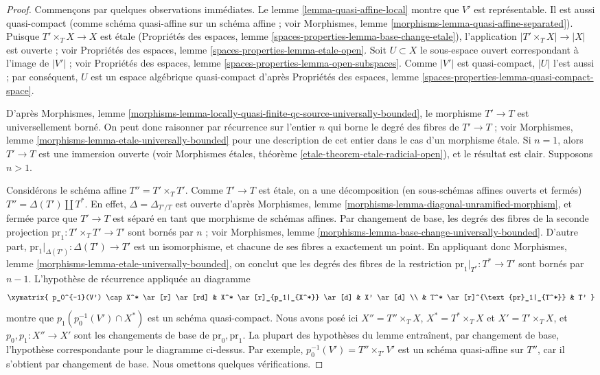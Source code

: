 \begin{proof}
Commençons par quelques observations immédiates.
Le lemme \ref{lemma-quasi-affine-local} montre que $V'$ est représentable.
Il est aussi quasi-compact (comme schéma quasi-affine sur un schéma affine ; voir
Morphismes, lemme \ref{morphisms-lemma-quasi-affine-separated}).
Puisque $T' \times_T X \to X$ est étale
(Propriétés des espaces, lemme \ref{spaces-properties-lemma-base-change-etale}),
l'application $|T' \times_T X| \to |X|$ est ouverte ; voir
Propriétés des espaces, lemme \ref{spaces-properties-lemma-etale-open}.
Soit $U \subset X$ le sous-espace ouvert correspondant à l'image de
$|V'|$ ; voir
Propriétés des espaces, lemme \ref{spaces-properties-lemma-open-subspaces}.
Comme $|V'|$ est quasi-compact, $|U|$ l'est aussi ; par conséquent,
$U$ est un espace algébrique quasi-compact d'après
Propriétés des espaces, lemme \ref{spaces-properties-lemma-quasi-compact-space}.

\medskip\noindent
D'après
Morphismes,
lemme \ref{morphisms-lemma-locally-quasi-finite-qc-source-universally-bounded},
le morphisme $T' \to T$ est universellement borné. On peut donc raisonner par
récurrence sur l'entier $n$ qui borne le degré des fibres de $T' \to T$ ; voir
Morphismes, lemme \ref{morphisms-lemma-etale-universally-bounded}
pour une description de cet entier dans le cas d'un morphisme étale.
Si $n = 1$, alors $T' \to T$ est une immersion ouverte (voir
Morphismes étales, théorème \ref{etale-theorem-etale-radicial-open}),
et le résultat est clair. Supposons $n > 1$.

\medskip\noindent
Considérons le schéma affine $T'' = T' \times_T T'$.
Comme $T' \to T$ est étale, on a une décomposition (en sous-schémas affines
ouverts et fermés) $T'' = \Delta(T') \amalg T^*$. En effet, $\Delta = \Delta_{T'/T}$
est ouverte d'après
Morphismes, lemme \ref{morphisms-lemma-diagonal-unramified-morphism},
et fermée parce que $T' \to T$ est séparé en tant que morphisme de schémas affines.
Par changement de base, les degrés des fibres de la seconde projection
$\text{pr}_1 : T' \times_T T' \to T'$ sont bornés par $n$ ; voir
Morphismes, lemme \ref{morphisms-lemma-base-change-universally-bounded}.
D'autre part, $\text{pr}_1|_{\Delta(T')} : \Delta(T') \to T'$ est
un isomorphisme, et chacune de ses fibres a exactement un point.
En appliquant donc
Morphismes, lemme \ref{morphisms-lemma-etale-universally-bounded},
on conclut que les degrés des fibres de la restriction
$\text{pr}_1|_{T^*} : T^* \to T'$ sont bornés par $n - 1$.
L'hypothèse de récurrence appliquée au diagramme
$$
\xymatrix{
p_0^{-1}(V') \cap X^* \ar[r] \ar[rd] &
X^* \ar[r]_{p_1|_{X^*}} \ar[d] &
X' \ar[d] \\
& T^* \ar[r]^{\text{pr}_1|_{T^*}} & T'
}
$$
montre que $p_1(p_0^{-1}(V') \cap X^*)$
est un schéma quasi-compact. Nous avons posé ici
$X'' = T'' \times_T X$, $X^* = T^* \times_T X$ et $X' = T' \times_T X$,
et $p_0, p_1 : X'' \to X'$ sont les changements de base de $\text{pr}_0, \text{pr}_1$.
La plupart des hypothèses du lemme entraînent,
par changement de base, l'hypothèse correspondante pour le diagramme ci-dessus.
Par exemple, $p_0^{-1}(V') = T'' \times_{T'} V'$
est un schéma quasi-affine sur $T''$, car il s'obtient par changement de base. Nous
omettons quelques vérifications.


\end{proof}
